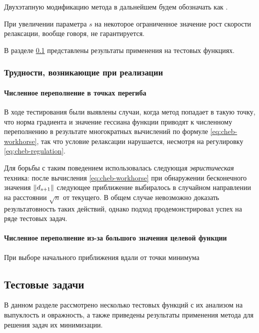 Двухэтапную модификацию метода \relch{} в дальнейшем будем обозначать
как \gdrelch{}.

\begin{rem}
  \label{rem:cheb-rel-speed}
  При увеличении параметра $s$ на некоторое ограниченное значение рост
  скорости релаксации, вообще говоря, не гарантируется.
\end{rem}

В разделе \ref{sec:test-problems} представлены результаты применения
\gdrelch{} на тестовых функциях.

\subsubsection{Трудности, возникающие при реализации \relch{}}

\paragraph{Численное переполнение в точках перегиба}
В ходе тестирования \relch{} были выявлены случаи, когда метод
попадает в такую точку, что норма градиента и значение гессиана
функции приводят к численному переполнению в результате многократных
вычислений по формуле \eqref{eq:cheb-workhorse}, так что условие
релаксации нарушается, несмотря на регулировку
\eqref{eq:cheb-regulation}.

Для борьбы с таким поведением использовалась следующая
\emph{эвристическая} техника: после вычисления
\eqref{eq:cheb-workhorse} при обнаружении бесконечного значения
$\left \lVert{d_{s+1}}\right \rVert$ следующее приближение выбиралось в случайном
направлении на расстоянии $\sqrt{n}$ от текущего. В общем случае
невозможно доказать результатовность таких действий, однако подход
продемонстрировал успех на ряде тестовых задач.

\paragraph{Численное переполнение из-за большого значения целевой
  функции}

При выборе начального приближения вдали от точки минимума

\clearpage
\subsection{Тестовые задачи}
\label{sec:test-problems}

В данном разделе рассмотрено несколько тестовых функций с их анализом
на выпуклость и овражность, а также приведены результаты применения
метода \relch{} для решения задач их минимизации.





